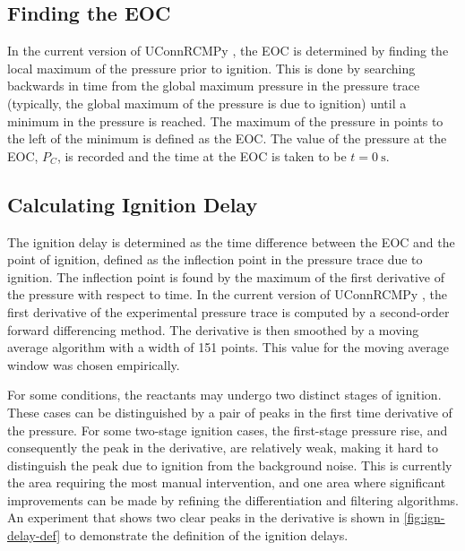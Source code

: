 \documentclass[12pt]{../ussci}
\begin{document}
\subsection{Finding the EOC}\label{finding-the-eoc}

In the current version of UConnRCMPy \autocite{uconnrcmpy}, the EOC is
determined by finding the local maximum of the pressure prior to
ignition. This is done by searching backwards in time from the global
maximum pressure in the pressure trace (typically, the global maximum of
the pressure is due to ignition) until a minimum in the pressure is
reached. The maximum of the pressure in points to the left of the minimum
is defined as the EOC. The value of the pressure at the EOC, \(P_C\), is
recorded and the time at the EOC is taken to be \(t=\SI{0}{\s}\).

\subsection{Calculating Ignition Delay}\label{calculating-ignition-delay}

The ignition delay is determined as the time difference between the EOC
and the point of ignition, defined as the inflection point in the pressure
trace due to ignition. The inflection point is found by the maximum
of the first derivative of the pressure with respect to time.
In the current version of UConnRCMPy \autocite{uconnrcmpy}, the first
derivative of the experimental pressure trace is computed by a
second-order forward differencing method. The derivative is then
smoothed by a moving average algorithm with a width of 151 points.
This value for the moving average window was chosen empirically.

For some conditions, the reactants may undergo two distinct stages of
ignition. These cases can be distinguished by a pair of peaks in the
first time derivative of the pressure. For some two-stage ignition
cases, the first-stage pressure rise, and consequently the peak in the
derivative, are relatively weak, making it hard to distinguish the peak
due to ignition from the background noise. This is currently the area
requiring the most manual intervention, and one area where significant
improvements can be made by refining the differentiation and
filtering algorithms. An experiment that shows two clear peaks
in the derivative is shown in \cref{fig:ign-delay-def} to
demonstrate the definition of the ignition delays.
\end{document}
